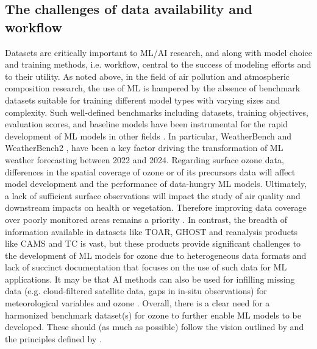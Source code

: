 \documentclass[gmd, manuscript]{copernicus}
\begin{document}
\subsection{The challenges of data availability and workflow }


Datasets are critically important to ML/AI research, and along with model choice and training methods, i.e. workflow, central to the success of modeling efforts and to their utility.  As noted above, in the field of air pollution and atmospheric composition research, the use of ML is hampered by the absence of benchmark datasets suitable for training different model types with varying sizes and complexity. Such well-defined benchmarks including datasets, training objectives, evaluation scores, and baseline models have been instrumental for the rapid development of ML models in other fields  \citep{Dueben2022}. In particular, WeatherBench and WeatherBench2 \citep{Rasp2020, Rasp2024}, have been a key factor driving the transformation of ML  weather forecasting between 2022 and 2024. 
Regarding surface ozone data, differences in the spatial coverage of ozone or of its precursors data will affect model development and the performance of data-hungry ML models. Ultimately, a lack of sufficient surface observations will impact the study of air quality and downstream impacts on health or vegetation. Therefore improving data coverage over poorly monitored areas remains a priority \citep{Schultz2017}.  
In contrast, the breadth of information available in datasets like TOAR, GHOST and reanalysis products like CAMS and TC is vast, but these products provide significant challenges to the development of ML models for ozone due to heterogeneous data formats and lack of succinct documentation that focuses on the use of such data for ML applications. 
It may be that AI methods can also be used for infilling missing data (e.g. cloud-filtered satellite data, gaps in in-situ observations) for meteorological variables \citep{Li2023_imputation} and ozone \citep{Arroyo2018, betancourt_global_2022}. Overall, there is a clear need for a harmonized benchmark dataset(s) for ozone to further enable ML models to be developed. These should (as much as possible) follow the vision outlined by \citet{ebert-uphoff_vision_2017} and the principles defined by \citet{Dueben2022}. 
\end{document}
